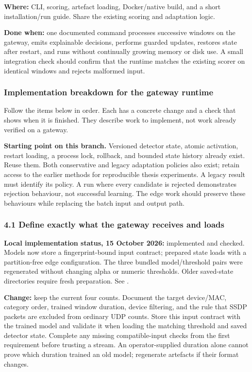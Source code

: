 \documentclass[11pt,a4paper]{article}
\begin{document}
\textbf{Where:} CLI, scoring, artefact loading, Docker/native build, and a short
installation/run guide. Share the existing scoring and adaptation logic.

\textbf{Done when:} one documented command processes successive windows on the
gateway, emits explainable decisions, performs guarded updates, restores state
after restart, and runs without continually growing memory or disk use. A small
integration check should confirm that the runtime matches the existing scorer
on identical windows and rejects malformed input.

\subsubsection*{Implementation breakdown for the gateway runtime}

Follow the items below in order. Each has a concrete change and a check that
shows when it is finished. They describe work to implement, not work already
verified on a gateway.

\textbf{Starting point on this branch.} Versioned detector state, atomic
activation, restart loading, a process lock, rollback, and bounded state history
already exist. Reuse them. Both conservative and legacy adaptation policies
also exist; retain access to the earlier methods for reproducible thesis
experiments. A legacy result must identify its policy. A run where every
candidate is rejected demonstrates rejection behaviour, not successful learning.
The edge work should preserve these behaviours while replacing the batch input
and output path.

\subsubsection*{4.1 Define exactly what the gateway receives and loads}

\textbf{Local implementation status, 15 October 2026:} implemented and checked.
Models now store a fingerprint-bound input contract; prepared state loads with a
partition-free edge configuration. The three bundled model/threshold pairs were
regenerated without changing alpha or numeric thresholds. Older saved-state
directories require fresh preparation. See .

\textbf{Change:} keep the current four counts. Document the target device/MAC,
category order, trained window duration, device filtering, and the rule that
SSDP packets are excluded from ordinary UDP counts. Store this input contract
with the trained model and validate it when loading the matching threshold and
saved detector state. Complete any missing compatible-input checks from the
first requirement before trusting a stream. An operator-supplied duration alone
cannot prove which duration trained an old model; regenerate artefacts if their
format changes.
\end{document}
